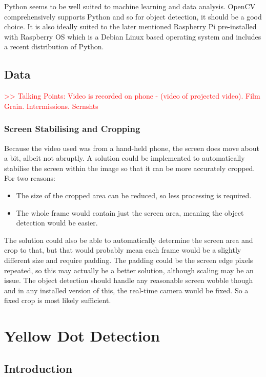\documentclass[final]{cmpreport_02}
\begin{document}
Python seems to be well suited to machine learning and data analysis. OpenCV comprehensively supports Python and so for object detection, it should be a good choice. It is also ideally suited to the later mentioned Raspberry Pi pre-installed with Raspberry OS which is a Debian Linux based operating system and includes a recent distribution of Python.

\subsection{Data}

\textcolor{red}{>> Talking Points: Video is recorded on phone - (video of projected video). Film Grain. Intermissions. Scrnshts}

\subsubsection{Screen Stabilising and Cropping}

Because the video used was from a hand-held phone, the screen does move about a bit, albeit not abruptly. A solution could be implemented to automatically stabilise the screen within the image so that it can be more accurately cropped. For two reasons:
\begin{itemize}
	\item The size of the cropped area can be reduced, so less processing is required.
	\item The whole frame would contain just the screen area, meaning the object detection would be easier.
\end{itemize}

The solution could also be able to automatically determine the screen area and crop to that, but that would probably mean each frame would be a slightly different size and require padding. The padding could be the screen edge pixels repeated, so this may actually be a better solution, although scaling may be an issue. The object detection should handle any reasonable screen wobble though and in any installed version of this, the real-time camera would be fixed. So a fixed crop is most likely sufficient.


\section{Yellow Dot Detection}

\subsection{Introduction}
\end{document}
